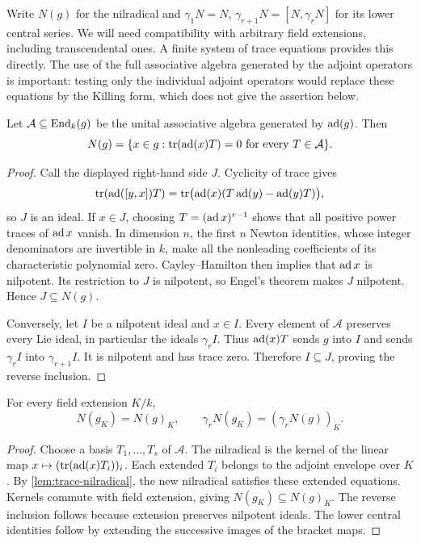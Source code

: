 Write $N(g)$ for the nilradical and
$\gamma_1N=N$, $\gamma_{r+1}N=[N,\gamma_rN]$ for its lower central
series. We will need compatibility with arbitrary field extensions,
including transcendental ones. A finite system of trace equations
provides this directly. The use of the full associative algebra generated
by the adjoint operators is important: testing only the individual
adjoint operators would replace these equations by the Killing form,
which does not give the assertion below.

\begin{lemma}\label{lem:trace-nilradical}
Let $\mathcal A\subseteq\operatorname{End}_k(g)$ be the unital associative
algebra generated by $\operatorname{ad}(g)$. Then
\[
 N(g)=
 \{x\in g:\operatorname{tr}(\operatorname{ad}(x)T)=0\text{ for every }T\in\mathcal A\}.
\]
\end{lemma}
\begin{proof}
Call the displayed right-hand side $J$. Cyclicity of trace gives
\[
 \operatorname{tr}(\operatorname{ad}([y,x])T)
 =\operatorname{tr}\bigl(\operatorname{ad}(x)(T\operatorname{ad}(y)-\operatorname{ad}(y)T)\bigr),
\]
so $J$ is an ideal. If $x\in J$, choosing
$T=(\operatorname{ad} x)^{r-1}$ shows that all positive power traces of $\operatorname{ad} x$
vanish. In dimension $n$, the first $n$ Newton identities, whose
integer denominators are invertible in $k$, make all the nonleading
coefficients of its characteristic polynomial zero. Cayley--Hamilton
then implies that $\operatorname{ad} x$ is nilpotent. Its restriction to $J$ is nilpotent, so Engel's theorem
makes $J$ nilpotent. Hence $J\subseteq N(g)$.

Conversely, let $I$ be a nilpotent ideal and $x\in I$. Every element
of $\mathcal A$ preserves every Lie ideal, in particular the ideals
$\gamma_rI$. Thus $\operatorname{ad}(x)T$ sends $g$ into $I$ and sends
$\gamma_rI$ into $\gamma_{r+1}I$. It is nilpotent and has trace zero.
Therefore $I\subseteq J$, proving the reverse inclusion.
\end{proof}

\begin{corollary}\label{cor:nilradical-extension}
For every field extension $K/k$,
\[
 N(g_K)=N(g)_K,\qquad
 \gamma_rN(g_K)=(\gamma_rN(g))_K.
\]
\end{corollary}
\begin{proof}
Choose a basis $T_1,\ldots,T_s$ of $\mathcal A$. The nilradical is
the kernel of the linear map
$x\mapsto(\operatorname{tr}(\operatorname{ad}(x)T_i))_i$. Each extended $T_i$ belongs to the
adjoint envelope over $K$. By \cref{lem:trace-nilradical}, the new
nilradical satisfies these extended equations. Kernels commute with
field extension, giving $N(g_K)\subseteq N(g)_K$.
The reverse inclusion follows because extension preserves nilpotent
ideals. The lower central identities follow by extending the successive
images of the bracket maps.
\end{proof}

